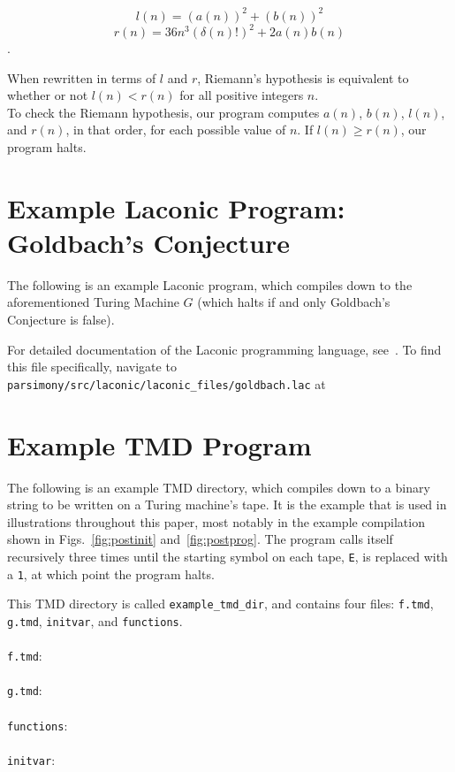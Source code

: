 \documentclass[11pt]{article}
\begin{document}
$$l(n) = (a(n))^2 + (b(n))^2$$
$$r(n) = 36n^3(\delta(n)!)^2 + 2a(n)b(n)$$.

When rewritten in terms of $l$ and $r$, Riemann's hypothesis is equivalent to whether or not $l(n) < r(n)$ for all positive integers $n$. \\

To check the Riemann hypothesis, our program computes $a(n)$, $b(n)$, $l(n)$, and $r(n)$, in that order, for each possible value of $n$. If $l(n) \ge r(n)$, our program halts.

\begin{appendices}
    
\section{Example Laconic Program: Goldbach's Conjecture \label{sec:applac}}

The following is an example Laconic program, which compiles down to the aforementioned Turing Machine $G$ (which halts if and only Goldbach's Conjecture is false).



For detailed documentation of the Laconic programming language, see~\cite{github}. To find this file specifically, navigate to \texttt{parsimony/src/laconic/laconic\_files/goldbach.lac} at~\cite{github}

\section{Example TMD Program \label{sec:apptmd}}

The following is an example TMD directory, which compiles down to a binary string to be written on a Turing machine's tape. It is the example that is used in illustrations throughout this paper, most notably in the example compilation shown in Figs.~\ref{fig:postinit} and~\ref{fig:postprog}. The program calls itself recursively three times until the starting symbol on each tape, \texttt{E}, is replaced with a \texttt{1}, at which point the program halts.

This TMD directory is called \texttt{example\_tmd\_dir}, and contains four files: \texttt{f.tmd}, \texttt{g.tmd}, \texttt{initvar}, and \texttt{functions}. \\ \\
\texttt{f.tmd}: \\ \\

\texttt{g.tmd}: \\ \\

\texttt{functions}: \\ \\

\texttt{initvar}: \\ \\
 


\end{appendices}
\end{document}
